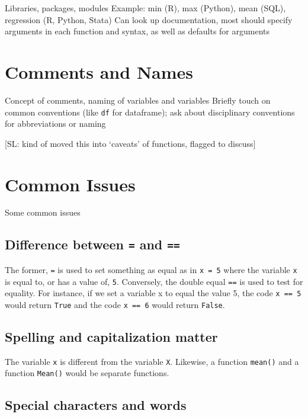 \documentclass[
]{book}
\begin{document}
Libraries, packages, modules
Example: min (R), max (Python), mean (SQL), regression (R, Python, Stata)
Can look up documentation, most should specify arguments in each function and syntax, as well as defaults for arguments

\chapter{Comments and Names}\label{comments-and-names}

Concept of comments, naming of variables and variables
Briefly touch on common conventions (like \texttt{df} for dataframe); ask about disciplinary conventions for abbreviations or naming

{[}SL: kind of moved this into `caveats' of functions, flagged to discuss{]}

\chapter{Common Issues}\label{common-issues}

Some common issues

\section{\texorpdfstring{Difference between \texttt{=} and \texttt{==}}{Difference between = and ==}}\label{difference-between-and}

The former, \texttt{=} is used to set something as equal as in \texttt{x\ =\ 5} where
the variable \texttt{x} is equal to, or has a value of, \texttt{5}. Conversely, the
double equal \texttt{==} is used to test for equality. For instance, if we set
a variable x to equal the value 5, the code \texttt{x\ ==\ 5} would return \texttt{True}
and the code \texttt{x\ ==\ 6} would return \texttt{False}.\\

\section{Spelling and capitalization matter}\label{spelling-and-capitalization-matter}

The variable \texttt{x} is different from the variable \texttt{X}. Likewise, a
function \texttt{mean()} and a function \texttt{Mean()} would be separate functions.

\section{Special characters and words}\label{special-characters-and-words}
\end{document}
